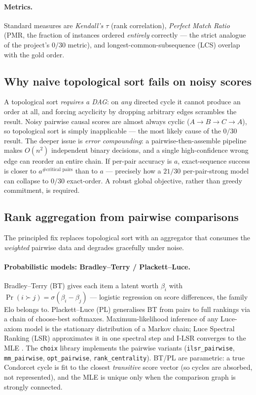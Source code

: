 \paragraph{Metrics.} Standard measures are \emph{Kendall's $\tau$} (rank
correlation), \emph{Perfect Match Ratio} (PMR, the fraction of instances ordered
\emph{entirely} correctly --- the strict analogue of the project's $0/30$
metric), and longest-common-subsequence (LCS) overlap with the gold order.

\subsection{Why naive topological sort fails on noisy scores}
\label{sec:toposort-fails}
A topological sort \emph{requires a DAG}: on \emph{any} directed cycle it cannot
produce an order at all, and forcing acyclicity by dropping arbitrary edges
scrambles the result. Noisy pairwise causal scores are almost always cyclic
($A\!\rightarrow\!B\!\rightarrow\!C\!\rightarrow\!A$), so topological sort is
simply inapplicable --- the most likely cause of the $0/30$ result. The deeper
issue is \emph{error compounding}: a pairwise-then-assemble pipeline makes
$O(n^2)$ independent binary decisions, and a single high-confidence wrong edge can
reorder an entire chain. If per-pair accuracy is $a$, exact-sequence success is
closer to $a^{\#\text{critical pairs}}$ than to $a$ --- precisely how a $21/30$
per-pair-strong model can collapse to $0/30$ exact-order. A robust global
objective, rather than greedy commitment, is required.

\subsection{Rank aggregation from pairwise comparisons}
\label{sec:rank-agg}
The principled fix replaces topological sort with an aggregator that consumes the
\emph{weighted} pairwise data and degrades gracefully under noise.

\paragraph{Probabilistic models: Bradley--Terry / Plackett--Luce.}
Bradley--Terry (BT) \citep{ord:bradley1952} gives each item a latent worth
$\beta_i$ with $\Pr(i \succ j) = \sigma(\beta_i - \beta_j)$ --- logistic
regression on score differences, the family Elo belongs to. Plackett--Luce (PL)
generalises BT from pairs to full rankings via a chain of choose-best softmaxes.
Maximum-likelihood inference of any Luce-axiom model is the stationary
distribution of a Markov chain; Luce Spectral Ranking (LSR) approximates it in one
spectral step and I-LSR converges to the MLE \citep{ord:maystre2015plackettluce}.
The \texttt{choix} library \citep{ord:choix} implements the pairwise variants
(\texttt{ilsr\_pairwise}, \texttt{mm\_pairwise}, \texttt{opt\_pairwise},
\texttt{rank\_centrality}). BT/PL are parametric: a true Condorcet cycle is fit to
the closest \emph{transitive} score vector (so cycles are absorbed, not
represented), and the MLE is unique only when the comparison graph is strongly
connected.

